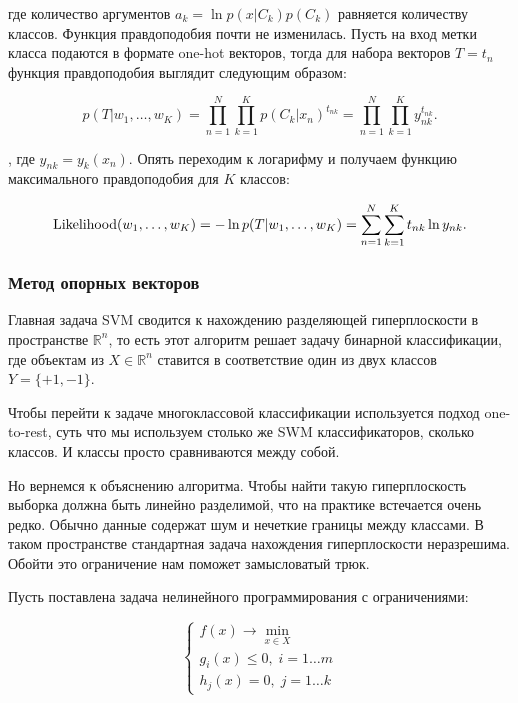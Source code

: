 где количество аргументов $a_k = \ln p(x|C_k)p(C_k)$ равняется количеству классов. Функция правдоподобия почти
не изменилась. Пусть на вход метки класса подаются в формате one-hot векторов, тогда для набора векторов $T =
{t_n}$ функция правдоподобия выглядит следующим образом:

\begin{equation}
 p(T|w_1,\ldots,w_K) = \prod_{n=1}^N \prod_{k=1}^K p(C_k|x_n)^{t_{nk}} = \prod_{n=1}^N \prod_{k=1}^K
y_{nk}^{t_{nk}}.
\end{equation}

, где $y_{nk} = y_k(x_n)$. Опять переходим к логарифму и получаем функцию максимального правдоподобия для $K$
классов:

\begin{equation}
 \operatorname*{Likelihood} (w_1,\ldots,w_K) = -\ln p(T|w_1,\ldots,w_K) = \sum_{n=1}^N \sum_{k=1}^K t_{nk}\ln y_{nk}.
\end{equation}


\subsubsection{Метод опорных векторов}

Главная задача SVM сводится к нахождению разделяющей гиперплоскости в пространстве $\mathbb{R}^n$, то есть этот алгоритм решает задачу бинарной классификации, где объектам из $X \in \mathbb{R}^n$ ставится в соответствие один из двух классов $Y = \{+1, -1\}$.

\bigskip
Чтобы перейти к задаче многоклассовой классификации используется подход one-to-rest, суть что мы используем столько же SWM классификаторов, сколько классов. И классы просто сравниваются между собой.

\bigskip
Но вернемся к объяснению алгоритма. Чтобы найти такую гиперплоскость выборка должна быть линейно разделимой, что на практике встечается очень редко. Обычно данные содержат шум и нечеткие границы между классами. В таком пространстве стандартная задача нахождения гиперплоскости неразрешима. Обойти это ограничение нам поможет замысловатый трюк.

\bigskip
Пусть поставлена задача нелинейного программирования с ограничениями:

$$
\begin{cases}
f(x) \to \min\limits_{x \in X} \\
g_i(x) \leq 0,\;i=1\ldots m \\
h_j(x) = 0,\;j=1\ldots k
\end{cases}
$$

